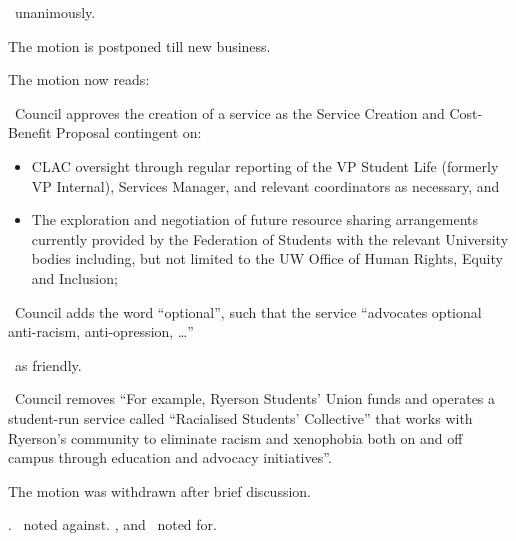 \begin{motion}
\begin{motion}
\begin{motion}
            \carries\ unanimously.
        \end{motion}

        The motion is postponed till new business.
    \end{motion}

    The motion now reads:

    \begin{motion}
        \birt\ Council approves the creation of a service as the Service
        Creation and Cost-Benefit Proposal contingent on:

        \begin{itemize}
            \item CLAC oversight through regular reporting of the VP Student
                Life (formerly VP Internal), Services Manager, and relevant
                coordinators as necessary, and 

            \item The exploration and negotiation of future resource sharing
                arrangements currently provided by the Federation of Students
                with the relevant University bodies including, but not limited
                to the UW Office of Human Rights, Equity and Inclusion;
        \end{itemize}
    \end{motion}

    \begin{motion}
        \birt\ Council adds the word ``optional'', such that the service 
        ``advocates optional anti-racism, anti-opression, \ldots'' 
        \movers{\alexander}{\seneca}

        \carries\ as friendly.
    \end{motion}

    \begin{motion}
        \birt\ Council removes ``For example, Ryerson Students' Union funds and
        operates a student-run service called ``Racialised Students'
        Collective'' that works with Ryerson's community to eliminate racism
        and xenophobia both on and off campus through education and advocacy
        initiatives''.
        \movers{\alexander}{\seneca}

        The motion was withdrawn after brief discussion.
    \end{motion}

    \carries. \harsh\ noted against. \nickta, and \alexander\ noted for.

\end{motion}
    
